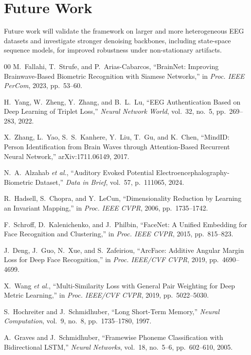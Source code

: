 \documentclass[a4paper,conference]{IEEEtran}
\begin{document}
	\section{Future Work}
	Future work will validate the framework on larger and more heterogeneous EEG datasets and investigate stronger denoising backbones, including state-space sequence models, for improved robustness under non-stationary artifacts.
	\begin{thebibliography}{00}
		M.~Fallahi, T.~Strufe, and P.~Arias-Cabarcos,
		``BrainNet: Improving Brainwave-Based Biometric Recognition with Siamese Networks,''
		in \emph{Proc. IEEE PerCom}, 2023, pp.~53--60.
		
		H.~Yang, W.~Zheng, Y.~Zhang, and B.~L.~Lu,
		``EEG Authentication Based on Deep Learning of Triplet Loss,''
		\emph{Neural Network World}, vol.~32, no.~5, pp.~269--283, 2022.
		
		X.~Zhang, L.~Yao, S.~S.~Kanhere, Y.~Liu, T.~Gu, and K.~Chen,
		``MindID: Person Identification from Brain Waves through Attention-Based Recurrent Neural Network,''
		arXiv:1711.06149, 2017.
		
		
		N.~A.~Alzahab \emph{et al.},
		``Auditory Evoked Potential Electroencephalography-Biometric Dataset,''
		\emph{Data in Brief}, vol.~57, p.~111065, 2024.
		
		R.~Hadsell, S.~Chopra, and Y.~LeCun,
		``Dimensionality Reduction by Learning an Invariant Mapping,''
		in \emph{Proc. IEEE CVPR}, 2006, pp.~1735--1742.
		
		F.~Schroff, D.~Kalenichenko, and J.~Philbin,
		``FaceNet: A Unified Embedding for Face Recognition and Clustering,''
		in \emph{Proc. IEEE CVPR}, 2015, pp.~815--823.
		
		J.~Deng, J.~Guo, N.~Xue, and S.~Zafeiriou,
		``ArcFace: Additive Angular Margin Loss for Deep Face Recognition,''
		in \emph{Proc. IEEE/CVF CVPR}, 2019, pp.~4690--4699.
		
		X.~Wang \emph{et al.},
		``Multi-Similarity Loss with General Pair Weighting for Deep Metric Learning,''
		in \emph{Proc. IEEE/CVF CVPR}, 2019, pp.~5022--5030.
		
		S.~Hochreiter and J.~Schmidhuber,
		``Long Short-Term Memory,''
		\emph{Neural Computation}, vol.~9, no.~8, pp.~1735--1780, 1997.
		
		A.~Graves and J.~Schmidhuber,
		``Framewise Phoneme Classification with Bidirectional LSTM,''
		\emph{Neural Networks}, vol.~18, no.~5--6, pp.~602--610, 2005.
		

\end{thebibliography}
\end{document}
